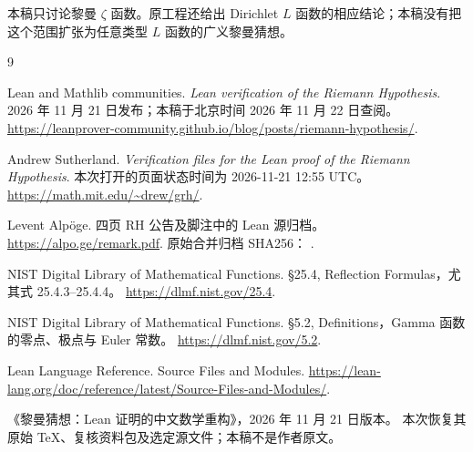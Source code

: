 本稿只讨论黎曼 $\zeta$ 函数。原工程还给出 Dirichlet $L$ 函数的相应结论；本稿没有把这个范围扩张为任意类型 $L$ 函数的广义黎曼猜想。

\backmatter
\begin{thebibliography}{9}
Lean and Mathlib communities.
\emph{Lean verification of the Riemann Hypothesis}.
2026 年 11 月 21 日发布；本稿于北京时间 2026 年 11 月 22 日查阅。
\url{https://leanprover-community.github.io/blog/posts/riemann-hypothesis/}.

Andrew Sutherland.
\emph{Verification files for the Lean proof of the Riemann Hypothesis}.
本次打开的页面状态时间为 2026-11-21 12:55 UTC。
\url{https://math.mit.edu/~drew/grh/}.

Levent Alpöge.
四页 RH 公告及脚注中的 Lean 源归档。
\url{https://alpo.ge/remark.pdf}.
原始合并归档 SHA256：
.

NIST Digital Library of Mathematical Functions.
§25.4, Reflection Formulas，尤其式 25.4.3--25.4.4。
\url{https://dlmf.nist.gov/25.4}.

NIST Digital Library of Mathematical Functions.
§5.2, Definitions，Gamma 函数的零点、极点与 Euler 常数。
\url{https://dlmf.nist.gov/5.2}.

Lean Language Reference. Source Files and Modules.
\url{https://lean-lang.org/doc/reference/latest/Source-Files-and-Modules/}.

《黎曼猜想：Lean 证明的中文数学重构》，2026 年 11 月 21 日版本。
本次恢复其原始 TeX、复核资料包及选定源文件；本稿不是作者原文。
\end{thebibliography}

